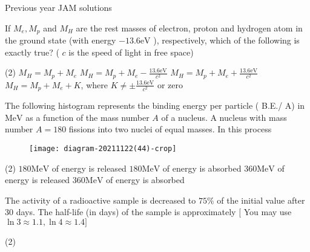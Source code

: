\newpage
\begin{abox}
Previous year JAM solutions
\end{abox}
\begin{enumerate}[ label=\color{ocre}\textbf{\arabic*.}]
	\begin{minipage}{\textwidth}
		\item If $M_{e}, M_{p}$ and $M_{H}$ are the rest masses of electron, proton and hydrogen atom in the ground state (with energy $-13.6 \mathrm{eV}$ ), respectively, which of the following is exactly true? ( $c$ is the speed of light in free space)
	\end{minipage}
	\begin{tasks}(2)
		\task[\textbf{A.}]$M_{H}=M_{p}+M_{e}$
		\task[\textbf{B.}] $M_{H}=M_{p}+M_{e}-\frac{13.6 \mathrm{eV}}{c^{2}}$
		\task[\textbf{C.}]$M_{H}=M_{p}+M_{e}+\frac{13.6 \mathrm{eV}}{c^{2}}$
		\task[\textbf{D.}] $M_{H}=M_{p}+M_{e}+K$, where $K \neq \pm \frac{13.6 \mathrm{eV}}{c^{2}}$ or zero
	\end{tasks}
 \begin{minipage}{\textwidth}
 	\item The following histogram represents the binding energy per particle ( B.E./ A) in $\mathrm{MeV}$ as a function of the mass number $A$ of a nucleus. A nucleus with mass number $A=180$ fissions into two nuclei of equal masses. In this process
 	\\
 	\begin{figure}[H]
 		\centering
 		\texttt{[image: diagram-20211122(44)-crop]}
 		\caption{}
 		\label{}
 	\end{figure}
 \end{minipage}
 \begin{tasks}(2)
 	\task[\textbf{A.}] $180 \mathrm{MeV}$ of energy is released 
 	\task[\textbf{B.}]$180 \mathrm{MeV}$ of energy is absorbed
 	\task[\textbf{C.}]$360 \mathrm{MeV}$ of energy is released
 	\task[\textbf{D.}]$360 \mathrm{MeV}$ of energy is absorbed
 \end{tasks}
\begin{minipage}{\textwidth}
	\item The activity of a radioactive sample is decreased to $75 \%$ of the initial value after 30 days. The half-life (in days) of the sample is approximately
	$[$ You may use $\ln 3 \approx 1.1, \ln 4 \approx 1.4]$
\end{minipage}
\begin{tasks}(2)

\end{tasks}
\end{enumerate}
